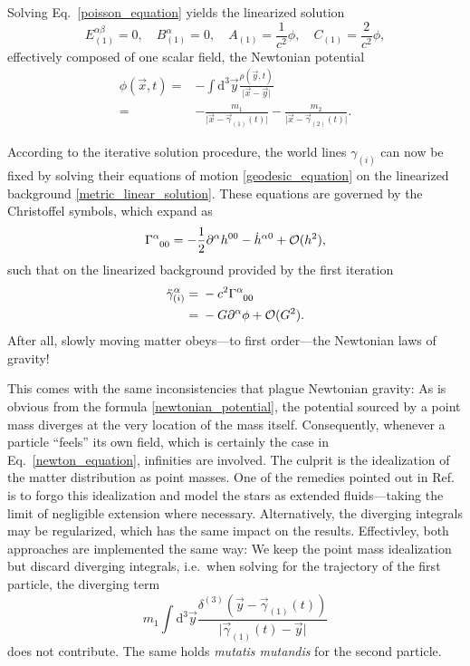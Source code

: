 Solving Eq.~\eqref{poisson_equation} yields the linearized solution
\begin{equation}\label{metric_linear_solution}
  E^{\alpha\beta}_{(1)} = 0,\quad B^\alpha_{(1)} = 0,\quad A_{(1)} = \frac{1}{c^2}\phi,\quad C_{(1)} = \frac{2}{c^2} \phi,
\end{equation}
effectively composed of one scalar field, the Newtonian potential
\begin{equation}\label{newtonian_potential}
  \begin{aligned}
    \phi(\vec x,t) = {} & - \int \mathrm d^3\vec y\frac{\rho(\vec y,t)}{\lvert\vec x-\vec y\rvert} \\
    = {} & - \frac{m_1}{\lvert\vec x-\vec\gamma_{(1)}(t)\rvert} - \frac{m_2}{\lvert\vec x-\vec\gamma_{(2)}(t)\rvert}.
  \end{aligned}
\end{equation}

According to the iterative solution procedure, the world lines $\gamma_{(i)}$ can now be fixed by solving their equations of motion \eqref{geodesic_equation} on the linearized background \eqref{metric_linear_solution}. These equations are governed by the Christoffel symbols, which expand as
\begin{equation}
  \Gamma^\alpha_{\hphantom\alpha 00} = -\frac{1}{2}\partial^\alpha h^{00} - \dot h^{\alpha 0} + \mathcal O(h^2),
\end{equation}
such that on the linearized background provided by the first iteration
\begin{equation}\label{newton_equation}
  \begin{aligned}
    \ddot \gamma^\alpha_{(i)} = {} & - c^2 \Gamma^\alpha_{\hphantom\alpha 00} \\
    = {} & -G \partial^\alpha \phi + \mathcal O(G^2).
  \end{aligned}
\end{equation}
After all, slowly moving matter obeys---to first order---the Newtonian laws of gravity!

This comes with the same inconsistencies that plague Newtonian gravity: As is obvious from the formula \eqref{newtonian_potential}, the potential sourced by a point mass diverges at the very location of the mass itself. Consequently, whenever a particle ``feels'' its own field, which is certainly the case in Eq.~\eqref{newton_equation}, infinities are involved. The culprit is the idealization of the matter distribution as point masses. One of the remedies pointed out in Ref.~\cite{poisson2014gravity} is to forgo this idealization and model the stars as extended fluids---taking the limit of negligible extension where necessary. Alternatively, the diverging integrals may be regularized, which has the same impact on the results. Effectivley, both approaches are implemented the same way: We keep the point mass idealization but discard diverging integrals, i.e.~when solving for the trajectory of the first particle, the diverging term
\begin{equation}
  m_1 \int\mathrm d^3\vec y \frac{\delta^{(3)}(\vec y - \vec\gamma_{(1)}(t))}{\lvert\vec\gamma_{(1)}(t) - \vec y\rvert}
\end{equation}
does not contribute. The same holds \emph{mutatis mutandis} for the second particle.

